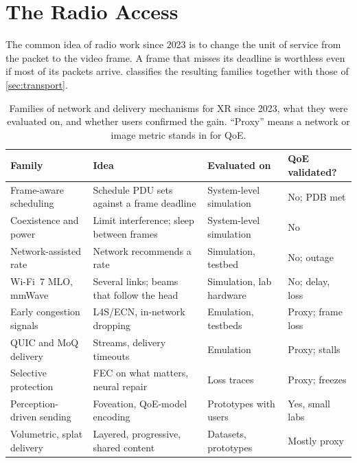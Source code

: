 \section{The Radio Access}\label{sec:radio}

The common idea of radio work since 2023 is to change the unit of service from the packet to the video
frame. A frame that misses its deadline is worthless even if most of its packets arrive.  classifies the
resulting families together with those of \cref{sec:transport}.

\begin{table}[t]
\centering\footnotesize
\caption{Families of network and delivery mechanisms for XR since 2023, what they were evaluated on, and
whether users confirmed the gain. ``Proxy'' means a network or image metric stands in for QoE.}
\label{tab:families}
\setlength{\tabcolsep}{3.5pt}
\begin{tabularx}{\linewidth}{@{}>{\raggedright\arraybackslash}p{3.2cm}>{\raggedright\arraybackslash}X>{\raggedright\arraybackslash}p{3.0cm}>{\raggedright\arraybackslash}p{2.1cm}@{}}
\toprule
Family & Idea & Evaluated on & QoE validated?\\
\midrule
Frame-aware scheduling & Schedule PDU sets against a frame deadline & System-level simulation & No; PDB met\\
Coexistence and power & Limit interference; sleep between frames & System-level simulation & No\\
Network-assisted rate & Network recommends a rate & Simulation, testbed & No; outage\\
Wi-Fi~7 MLO, mmWave & Several links; beams that follow the head & Simulation, lab hardware & No; delay, loss\\
Early congestion signals & L4S/ECN, in-network dropping & Emulation, testbeds & Proxy; frame loss\\
QUIC and MoQ delivery & Streams, delivery timeouts & Emulation & Proxy; stalls\\
Selective protection & FEC on what matters, neural repair & Loss traces & Proxy; freezes\\
Perception-driven sending & Foveation, QoE-model encoding & Prototypes with users & Yes, small labs\\
Volumetric, splat delivery & Layered, progressive, shared content & Datasets, prototypes & Mostly proxy\\
\bottomrule
\end{tabularx}
\end{table}

